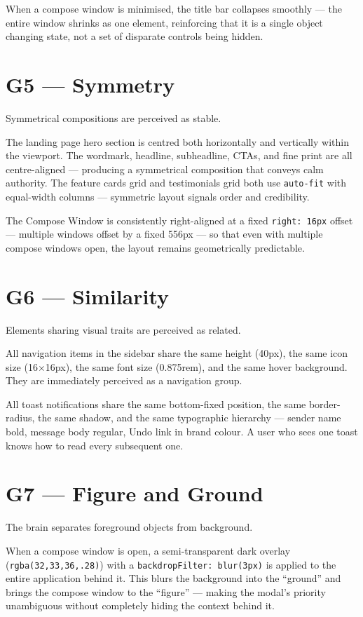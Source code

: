 \documentclass[12pt,a4paper]{report}
\begin{document}
When a compose window is minimised, the title bar collapses smoothly — the entire window
shrinks as one element, reinforcing that it is a single object changing state, not a set of
disparate controls being hidden.

\section{G5 — Symmetry}

Symmetrical compositions are perceived as stable.

The landing page hero section is centred both horizontally and vertically within the viewport.
The wordmark, headline, subheadline, CTAs, and fine print are all centre-aligned — producing
a symmetrical composition that conveys calm authority. The feature cards grid and testimonials
grid both use \texttt{auto-fit} with equal-width columns — symmetric layout signals order
and credibility.

The Compose Window is consistently right-aligned at a fixed \texttt{right: 16px} offset —
multiple windows offset by a fixed 556px — so that even with multiple compose windows open,
the layout remains geometrically predictable.

\section{G6 — Similarity}

Elements sharing visual traits are perceived as related.

All navigation items in the sidebar share the same height (40px), the same icon size
(16$\times$16px), the same font size (0.875rem), and the same hover background. They are
immediately perceived as a navigation group.

All toast notifications share the same bottom-fixed position, the same border-radius, the
same shadow, and the same typographic hierarchy — sender name bold, message body regular,
Undo link in brand colour. A user who sees one toast knows how to read every subsequent one.

\section{G7 — Figure and Ground}

The brain separates foreground objects from background.

When a compose window is open, a semi-transparent dark overlay (\texttt{rgba(32,33,36,.28)})
with a \texttt{backdropFilter: blur(3px)} is applied to the entire application behind it.
This blurs the background into the ``ground'' and brings the compose window to the
``figure'' — making the modal's priority unambiguous without completely hiding the
context behind it.
\end{document}
